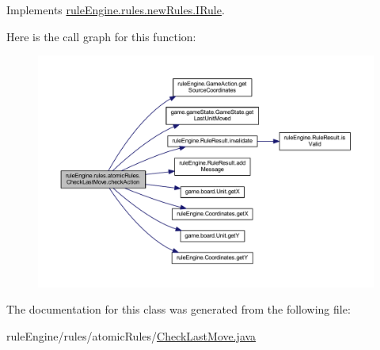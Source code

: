 Implements \mbox{\hyperlink{interfacerule_engine_1_1rules_1_1new_rules_1_1_i_rule_a72ce29a47d7a5fba75a09444a50a481e}{rule\+Engine.\+rules.\+new\+Rules.\+I\+Rule}}.

Here is the call graph for this function\+:
\nopagebreak
\begin{figure}[H]
\begin{center}
\leavevmode
\includegraphics[width=350pt]{classrule_engine_1_1rules_1_1atomic_rules_1_1_check_last_move_a1af50d2d1a89a15746df969f1925f66c_cgraph}
\end{center}
\end{figure}


The documentation for this class was generated from the following file\+:\begin{DoxyCompactItemize}
\item 
rule\+Engine/rules/atomic\+Rules/\mbox{\hyperlink{_check_last_move_8java}{Check\+Last\+Move.\+java}}\end{DoxyCompactItemize}
